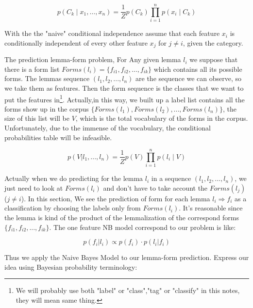 \documentclass[a4paper]{article}
\begin{document}
\[p(C_{k}\mid x_{1},\dots ,x_{n})={\frac {1}{Z}}p(C_{k})\prod _{i=1}^{n}p(x_{i}\mid C_{k})\]

With the the "naive" conditional independence assume that each feature $x_{i}$ is conditionally independent of every other feature $x_{j}$ for $j \neq i$, given the category. 

The prediction lemma-form problem, For Any given lemma $l_i$ we suppose that there is a form list $Forms(l_i)=\{f_{i1},f_{i2},...,f_{ik}\}$ which contains all its possible forms. The lemmas sequence $(l_1,l_2,...,l_n)$ are the sequence we can observe, so we take them as features. Then the form sequence is the classes that we want to put the features in\footnote{We will probably use both "label" or "class","tag" or "classify" in this notes, they will mean same thing.}. Actually,in this way,  we built up a label list contains all the forms show up in the corpus $\{Forms(l_1),Forms(l_2),..., Forms(l_n)\}$, the size of this list will be $V$, which is the total vocabulary of the forms in the corpus. Unfortunately, due to the immense of the vocabulary, the conditional probabilities table will be infeasible.

\[p(V|l_1,...,l_n) = \frac{1}{Z} p(V) \prod _{i=1}^{n}p(l_i \mid V) \]

Actually when we do predicting for the lemma $l_i$ in a sequence $(l_1,l_2,...,l_n)$, we just need to look at $Forms(l_i)$ and don't have to take account the $Forms(l_j)$ ($j \neq i$). In this section, We see the prediction of form for each lemma $l_i  \Longrightarrow f_i$ as a classification by choosing the labels only from $Forms(l_i)$. It's reasonable since the lemma is kind of the product of the lemmalization of the correspond forms $\{f_{i1},f_{i2},...,f_{ik}\}$. The one feature NB model correspond to our problem is like:

\[p(f_i|l_i) \propto p(f_i) \cdot  p(l_i|f_i)\]

Thus we apply the Naive Bayes Model to our lemma-form prediction. Express our idea using Bayesian probability terminology:
\end{document}
